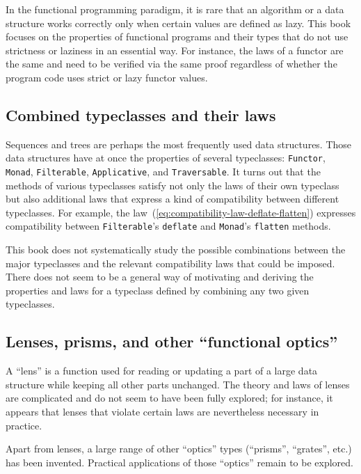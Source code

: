 In the functional programming paradigm, it is rare that an algorithm
or a data structure works correctly only when certain values are defined
as lazy. This book focuses on the properties of functional programs
and their types that do not use strictness or laziness in an essential
way. For instance, the laws of a functor are the same and need to
be verified via the same proof regardless of whether the program code
uses strict or lazy functor values. 

\subsection{Combined typeclasses and their laws}

Sequences and trees are perhaps the most frequently used data structures.
Those data structures have at once the properties of several typeclasses:
\lstinline!Functor!, \lstinline!Monad!, \lstinline!Filterable!,
\lstinline!Applicative!, and \lstinline!Traversable!. It turns out
that the methods of various typeclasses satisfy not only the laws
of their own typeclass but also additional laws that express a kind
of compatibility between different typeclasses. For example, the law~(\ref{eq:compatibility-law-deflate-flatten})
expresses compatibility between \lstinline!Filterable!\textsf{'}s \lstinline!deflate!
and \lstinline!Monad!\textsf{'}s \lstinline!flatten! methods.

This book does not systematically study the possible combinations
between the major typeclasses and the relevant compatibility laws
that could be imposed. There does not seem to be a general way of
motivating and deriving the properties and laws for a typeclass defined
by combining any two given typeclasses.

\subsection{Lenses, prisms, and other \textquotedblleft functional optics\textquotedblright}

A \textsf{``}lens\textsf{''} is a function used for reading or updating a part of
a large data structure while keeping all other parts unchanged. The
theory and laws of lenses are complicated and do not seem to have
been fully explored; for instance, it appears that lenses that violate
certain laws are nevertheless necessary in practice. 

Apart from lenses, a large range of other \textsf{``}optics\textsf{''} types (\textsf{``}prisms\textsf{''},
\textsf{``}grates\textsf{''}, etc.) has been invented. Practical applications of those
\textsf{``}optics\textsf{''} remain to be explored.

